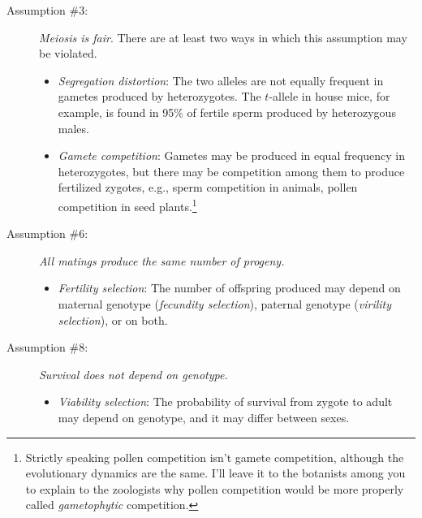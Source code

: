 \documentclass[12pt]{article}
\begin{document}
\begin{description}

\item[Assumption \#3:] {\it Meiosis is fair}. There are at least two
  ways in which this assumption may be violated.

\begin{itemize}

\item {\it Segregation distortion\/}: The two alleles are not equally
  frequent in gametes produced by heterozygotes. The $t$-allele in
  house mice, for example, is found in 95\% of fertile sperm produced
  by heterozygous males.

\item {\it Gamete competition\/}: Gametes may be produced in equal
  frequency in heterozygotes, but there may be competition among them
  to produce fertilized zygotes, e.g., sperm competition in animals,
  pollen competition in seed plants.\footnote{Strictly speaking pollen competition isn't
    gamete competition, although the evolutionary dynamics are the
    same. I'll leave it to the botanists among you to explain to the
    zoologists why pollen competition would be more properly called
    {\it gametophytic\/} competition.}

\end{itemize}

\item[Assumption \#6:] {\it All matings produce the same number of
progeny.}

\begin{itemize}

\item {\it Fertility selection\/}: The number of offspring produced
  may depend on maternal genotype ({\it fecundity selection\/}),
  paternal genotype ({\it virility selection\/}), or on
  both.

\end{itemize}

\item[Assumption \#8:] {\it Survival does not depend on genotype.}

\begin{itemize}

\item {\it Viability selection\/}: The probability of survival from
  zygote to adult may depend on genotype, and it may differ between
  sexes.

\end{itemize}

\end{description}
\end{document}
